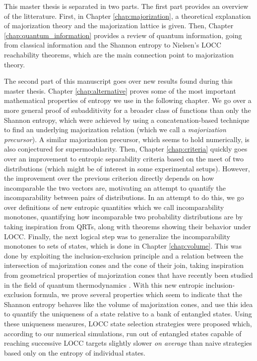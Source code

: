 This master thesis is separated in two parts. The first part provides an overview of the litterature. First, in Chapter \ref{chap:majorization}, a theoretical explanation of majorization theory and the majorization lattice is given. Then, Chapter \ref{chap:quantum_information} provides a review of quantum information, going from classical information and the Shannon entropy to Nielsen's LOCC reachability theorems, which are the main connection point to majorization theory.

The second part of this manuscript goes over new results found during this master thesis. Chapter \ref{chap:alternative} proves some of the most important mathematical properties of entropy we use in the following chapter. We go over a more general proof of subadditivity for a broader class of functions than only the Shannon entropy, which were achieved by using a concatenation-based technique to find an underlying majorization relation (which we call a \textit{majorization precursor}). A similar majorization precursor, which seems to hold numerically, is also conjectured for supermodularity. Then, Chapter \ref{chap:criteria} quickly goes over an improvement to entropic separability criteria based on the meet of two distributions (which might be of interest in some experimental setups). However, the improvement over the previous criterion directly depends on how incomparable the two vectors are, motivating an attempt to quantify the incomparability between pairs of distributions. In an attempt to do this, we go over definitions of new entropic quantities which we call incomparability monotones, quantifying how incomparable two probability distributions are by taking inspiration from QRTs, along with theorems showing their behavior under LOCC. Finally, the next logical step was to generalize the incomparability monotones to sets of states, which is done in Chapter \ref{chap:volume}. This was done by exploiting the inclusion-exclusion principle and a relation between the intersection of majorization cones and the cone of their join, taking inspiration from geometrical properties of majorization cones that have recently been studied in the field of quantum thermodynamics \cite{junior_geometric_2022}. With this new entropic inclusion-exclusion formula, we prove several properties which seem to indicate that the Shannon entropy behaves like the volume of majorization cones, and use this idea to quantify the uniqueness of a state relative to a bank of entangled states. Using these uniqueness measures, LOCC state selection strategies were proposed which, according to our numerical simulations, run out of entangled states capable of reaching successive LOCC targets slightly slower \textit{on average} than naive strategies based only on the entropy of individual states.
